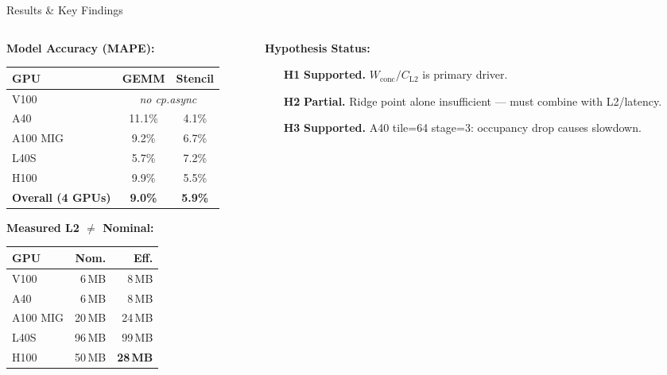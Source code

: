 \documentclass[aspectratio=169,10pt]{beamer}
\begin{document}
\begin{frame}{Results \& Key Findings}

\begin{columns}[T]
\begin{column}{0.36\textwidth}
\textbf{Model Accuracy (MAPE):}

\vspace{0.2em}
\renewcommand{\arraystretch}{1.15}
\begin{table}
\centering
\scriptsize
\begin{tabular}{@{}lcc@{}}
\toprule
\textbf{GPU} & \textbf{GEMM} & \textbf{Stencil} \\
\midrule
\textcolor{gpuV100}{V100}   & \multicolumn{2}{c}{\textit{no cp.async}} \\
\textcolor{gpuA40}{A40}     & 11.1\% & 4.1\% \\
\textcolor{gpuA100}{A100 MIG} & 9.2\% & 6.7\% \\
\textcolor{gpuL40S}{L40S}   & 5.7\% & 7.2\% \\
\textcolor{gpuH100}{H100}   & 9.9\% & 5.5\% \\
\midrule
\textbf{Overall (4 GPUs)} & \textbf{9.0\%} & \textbf{5.9\%} \\
\bottomrule
\end{tabular}
\end{table}

\vspace{0.2em}
\textbf{Measured L2 $\neq$ Nominal:}
\vspace{0.1em}
\renewcommand{\arraystretch}{1.1}
\begin{table}
\centering
\scriptsize
\begin{tabular}{@{}lrr@{}}
\toprule
\textbf{GPU} & \textbf{Nom.} & \textbf{Eff.} \\
\midrule
V100 & 6\,MB  & 8\,MB \\
A40  & 6\,MB  & 8\,MB \\
A100 MIG & 20\,MB & 24\,MB \\
L40S & 96\,MB & 99\,MB \\
H100 & 50\,MB & \textbf{28\,MB} \\
\bottomrule
\end{tabular}
\end{table}
\end{column}

\begin{column}{0.62\textwidth}
\textbf{Hypothesis Status:}
\begin{itemize}\scriptsize
    \item[\textcolor{green!60!black}{\textbf{H1}}] \textbf{Supported.} $W_{\text{conc}}/C_{\text{L2}}$ is primary driver.
    \item[\textcolor{yellow!60!black}{\textbf{H2}}] \textbf{Partial.} Ridge point alone insufficient --- must combine with L2/latency.
    \item[\textcolor{green!60!black}{\textbf{H3}}] \textbf{Supported.} A40 tile=64 stage=3: occupancy drop causes slowdown.
\end{itemize}


\end{column}
\end{columns}
\end{frame}
\end{document}
